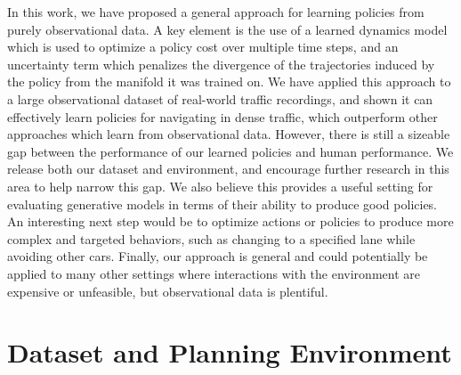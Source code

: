 \documentclass{article} %
\begin{document}
  In this work, we have proposed a general approach for learning policies from purely observational data. A key element is the use of a learned dynamics model which is used to optimize a policy cost over multiple time steps, and an uncertainty term which penalizes the divergence of the trajectories induced by the policy from the manifold it was trained on.
  We have applied this approach to a large observational dataset of real-world traffic recordings, and shown it can effectively learn policies for navigating in dense traffic, which outperform other approaches which learn from observational data.
  However, there is still a sizeable gap between the performance of our learned policies and human performance.
  We release both our dataset and environment, and encourage further research in this area to help narrow this gap.
  We also believe this provides a useful setting for evaluating generative models in terms of their ability to produce good policies.
  An interesting next step would be to optimize actions or policies to produce more complex and targeted behaviors, such as changing to a specified lane while avoiding other cars.
  Finally, our approach is general and could potentially be applied to many other settings where interactions with the environment are expensive or unfeasible, but observational data is plentiful.







\appendix

\section{Dataset and Planning Environment}
\label{i80-dataset-prep}
\end{document}
